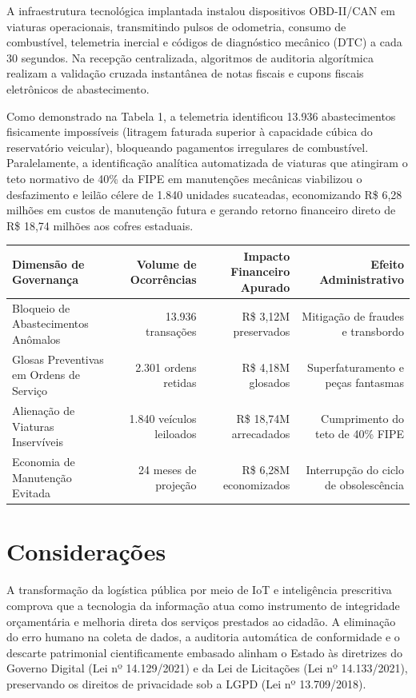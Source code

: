 \documentclass[12pt,a4paper]{article}
\begin{document}
A infraestrutura tecnológica implantada instalou dispositivos OBD-II/CAN em viaturas operacionais, transmitindo pulsos de odometria, consumo de combustível, telemetria inercial e códigos de diagnóstico mecânico (DTC) a cada 30 segundos. Na recepção centralizada, algoritmos de auditoria algorítmica realizam a validação cruzada instantânea de notas fiscais e cupons fiscais eletrônicos de abastecimento.

Como demonstrado na Tabela 1, a telemetria identificou 13.936 abastecimentos fisicamente impossíveis (litragem faturada superior à capacidade cúbica do reservatório veicular), bloqueando pagamentos irregulares de combustível. Paralelamente, a identificação analítica automatizada de viaturas que atingiram o teto normativo de 40\% da FIPE em manutenções mecânicas viabilizou o desfazimento e leilão célere de 1.840 unidades sucateadas, economizando R\$ 6,28 milhões em custos de manutenção futura e gerando retorno financeiro direto de R\$ 18,74 milhões aos cofres estaduais.



\begin{table}[htbp]
\centering
\small
\begin{tabular}{lrrr}
\toprule
\textbf{Dimensão de Governança} & \textbf{Volume de Ocorrências} & \textbf{Impacto Financeiro Apurado} & \textbf{Efeito Administrativo} \\
\midrule
Bloqueio de Abastecimentos Anômalos & 13.936 transações & R\$ 3,12M preservados & Mitigação de fraudes e transbordo \\
Glosas Preventivas em Ordens de Serviço & 2.301 ordens retidas & R\$ 4,18M glosados & Superfaturamento e peças fantasmas \\
Alienação de Viaturas Inservíveis & 1.840 veículos leiloados & R\$ 18,74M arrecadados & Cumprimento do teto de 40\% FIPE \\
Economia de Manutenção Evitada & 24 meses de projeção & R\$ 6,28M economizados & Interrupção do ciclo de obsolescência \\
\bottomrule
\end{tabular}
\end{table}


\section{Considerações}

A transformação da logística pública por meio de IoT e inteligência prescritiva comprova que a tecnologia da informação atua como instrumento de integridade orçamentária e melhoria direta dos serviços prestados ao cidadão. A eliminação do erro humano na coleta de dados, a auditoria automática de conformidade e o descarte patrimonial cientificamente embasado alinham o Estado às diretrizes do Governo Digital (Lei nº 14.129/2021) e da Lei de Licitações (Lei nº 14.133/2021), preservando os direitos de privacidade sob a LGPD (Lei nº 13.709/2018).
\end{document}
